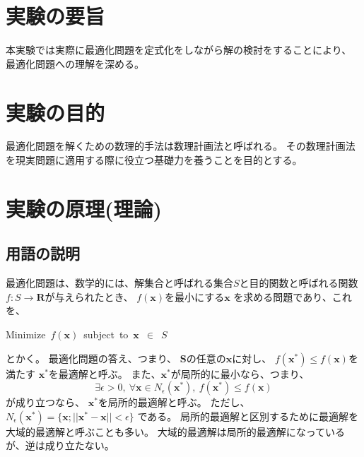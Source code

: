 \documentclass[12pt]{jarticle}
\begin{document}



\section{実験の要旨}
本実験では実際に最適化問題を定式化をしながら解の検討をすることにより、
最適化問題への理解を深める。

\section{実験の目的}
最適化問題を解くための数理的手法は数理計画法と呼ばれる。
その数理計画法を現実問題に適用する際に役立つ基礎力を養うことを目的とする。

\section{実験の原理(理論)}
\subsection{用語の説明}
最適化問題は、数学的には、解集合と呼ばれる集合$S$と目的関数と呼ばれる関数
$f:S\rightarrow\boldsymbol{R}$が与えられたとき、
$f(\boldsymbol{x})$を最小にする$\boldsymbol{x}$
を求める問題であり、これを、
\begin{center}
    Minimize\ $f(\boldsymbol{x})$\ subject\ to\ $\boldsymbol{x}$\ $\in$\ $S$
\end{center}
とかく。
最適化問題の答え、つまり、
$\boldsymbol{S}$の任意の$\boldsymbol{x}$に対し、
$f(\boldsymbol{x^*})\leq f(\boldsymbol{x})$を満たす
$\boldsymbol{x^*}$を最適解と呼ぶ。
また、$\boldsymbol{x^*}$が局所的に最小なら、つまり、
\begin{equation}
    \exists \epsilon >0,\ \forall \boldsymbol{x} \in N_\epsilon(\boldsymbol{x^*}),\ f(\boldsymbol{x^*})\leq f(\boldsymbol{x})\nonumber
\end{equation}
が成り立つなら、
$\boldsymbol{x^*}$を局所的最適解と呼ぶ。
ただし、$N_\epsilon(\boldsymbol{x^*})=\{\boldsymbol{x};||\boldsymbol{x^*}-\boldsymbol{x}||<\epsilon\}$
である。
局所的最適解と区別するために最適解を大域的最適解と呼ぶことも多い。
大域的最適解は局所的最適解になっているが、逆は成り立たない。
\end{document}
